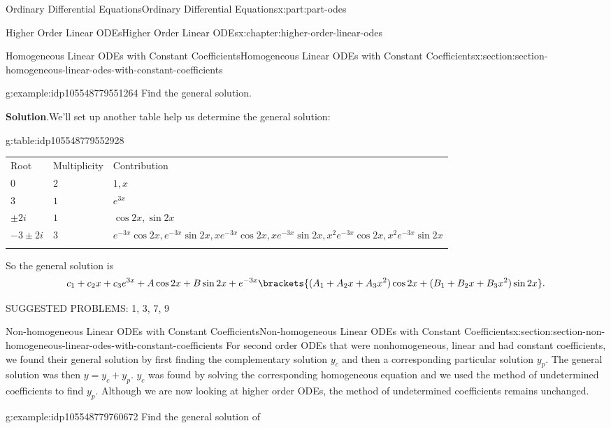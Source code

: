 \documentclass[oneside,10pt,]{book}
\newcommand{\blocktitlefont}{\relax}
\newcommand{\tabularfont}{\relax}
\numberwithin{equation}{part}
\newcommand{\hrulethick} {\noalign{\hrule height 0.11em}}
\begin{document}
\begin{partptx}{Ordinary Differential Equations}{}{Ordinary Differential Equations}{}{}{x:part:part-odes}
\begin{chapterptx}{Higher Order Linear ODEs}{}{Higher Order Linear ODEs}{}{}{x:chapter:higher-order-linear-odes}
\begin{sectionptx}{Homogeneous Linear ODEs with Constant Coefficients}{}{Homogeneous Linear ODEs with Constant Coefficients}{}{}{x:section:section-homogeneous-linear-odes-with-constant-coefficients}
\begin{example}{}{g:example:idp105548779551264}
Find the general solution.%
\par\smallskip%
\noindent\textbf{\blocktitlefont Solution}.\hypertarget{g:solution:idp105548779552544}{}\quad{}We'll set up another table help us determine the general solution:%
\begin{tableptx}{\textbf{}}{g:table:idp105548779552928}{}%
\centering%
{\tabularfont%
\begin{tabular}{lll}\hrulethick
Root&Multiplicity&Contribution\tabularnewline\hrulethick
\(0\)&\(2\)&\(1,x\)\tabularnewline\hrulethick
\(3\)&\(1\)&\(e^{3x}\)\tabularnewline\hrulethick
\(\pm2i\)&\(1\)&\(\cos2x,\sin2x\)\tabularnewline\hrulethick
\(-3\pm2i\)&\(3\)&\(e^{-3x}\cos2x,e^{-3x}\sin2x,xe^{-3x}\cos2x,xe^{-3x}\sin2x,x^{2}e^{-3x}\cos2x,x^{2}e^{-3x}\sin2x\)\tabularnewline\hrulethick
\end{tabular}
}%
\end{tableptx}%
So the general solution is%
\begin{equation*}
c_{1}+c_{2}x+c_{3}e^{3x}+A\cos2x+B\sin2x+e^{-3x}\brackets{(A_{1}+A_{2}x+A_{3}x^{2})\cos2x+(B_{1}+B_{2}x+B_{3}x^{2})\sin2x}.
\end{equation*}
%
\end{example}
\begin{conclusion}{}%
SUGGESTED PROBLEMS: 1, 3, 7, 9%
\end{conclusion}%
\end{sectionptx}
%
%
\typeout{************************************************}
\typeout{************************************************}
%
\begin{sectionptx}{Non-homogeneous Linear ODEs with Constant Coefficients}{}{Non-homogeneous Linear ODEs with Constant Coefficients}{}{}{x:section:section-non-homogeneous-linear-odes-with-constant-coefficients}
For second order ODEs that were nonhomogeneous, linear and had constant coefficients, we found their general solution by first finding the complementary solution \(y_{c}\) and then a corresponding particular solution \(y_{p}\). The general solution was then \(y=y_{c}+y_{p}\). \(y_{c}\) was found by solving the corresponding homogeneous equation and we used the method of undetermined coefficients to find \(y_{p}\). Although we are now looking at higher order ODEs, the method of undetermined coefficients remains unchanged.%
\begin{example}{}{g:example:idp105548779760672}%
Find the general solution of%
\begin{equation*}

\end{equation*}
\end{example}
\end{sectionptx}
\end{chapterptx}
\end{partptx}
\end{document}
